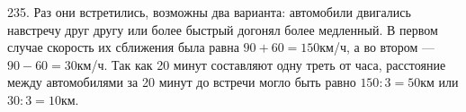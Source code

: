 235. Раз они встретились, возможны два варианта: автомобили двигались навстречу друг другу или более быстрый догонял более медленный. В первом случае скорость их сближения была равна $90+60=150$км/ч, а во втором --- $90-60=30$км/ч. Так как 20 минут составляют одну треть от часа, расстояние между автомобилями за 20 минут до встречи могло быть равно $150:3=50$км или $30:3=10$км.\\
